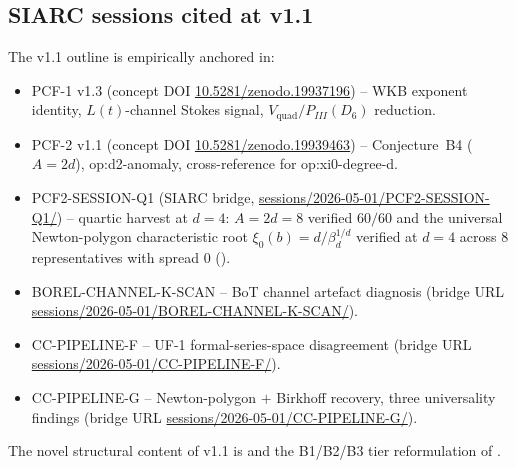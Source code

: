 \documentclass[11pt,reqno]{amsart}
\theoremstyle{plain}
\theoremstyle{definition}
\theoremstyle{remark}
\newcommand{\Lt}{L(t)}
\newcommand{\Vquad}{V_{\mathrm{quad}}}
\begin{document}
\subsection{SIARC sessions cited at v1.1}
The v1.1 outline is empirically anchored in:
\begin{itemize}
\item PCF-1 v1.3 \cite{siarc_pcf1_v13} (concept DOI
\href{https://doi.org/10.5281/zenodo.19937196}{10.5281/zenodo.19937196})
-- WKB exponent identity, $\Lt$-channel Stokes signal,
$\Vquad / P_{III}(D_6)$ reduction.
\item PCF-2 v1.1 \cite{siarc_pcf2_v11} (concept DOI
\href{https://doi.org/10.5281/zenodo.19939463}{10.5281/zenodo.19939463})
-- Conjecture~B4 ($A = 2d$), \textsf{op:d2-anomaly},
cross-reference for \textsf{op:xi0-degree-d}.
\item PCF2-SESSION-Q1 \cite{siarc_pcf2_session_q1}
(SIARC bridge,
\href{https://github.com/papanokechi/siarc-relay-bridge/tree/main/sessions/2026-05-01/PCF2-SESSION-Q1/}{sessions/2026-05-01/PCF2-SESSION-Q1/})
-- quartic harvest at $d=4$: $A = 2d = 8$ verified $60/60$
and the universal Newton-polygon characteristic root
$\xi_0(b) = d / \beta_d^{1/d}$ verified at $d=4$ across $8$
representatives with spread $0$
().
\item BOREL-CHANNEL-K-SCAN \cite{siarc_borel_kscan} -- BoT
channel artefact diagnosis (bridge URL
\href{https://github.com/papanokechi/siarc-relay-bridge/tree/main/sessions/2026-05-01/BOREL-CHANNEL-K-SCAN/}{sessions/2026-05-01/BOREL-CHANNEL-K-SCAN/}).
\item CC-PIPELINE-F \cite{siarc_cc_pipeline_f} -- UF-1
formal-series-space disagreement (bridge URL
\href{https://github.com/papanokechi/siarc-relay-bridge/tree/main/sessions/2026-05-01/CC-PIPELINE-F/}{sessions/2026-05-01/CC-PIPELINE-F/}).
\item CC-PIPELINE-G \cite{siarc_cc_pipeline_g} --
Newton-polygon $+$ Birkhoff recovery, three universality
findings (bridge URL
\href{https://github.com/papanokechi/siarc-relay-bridge/tree/main/sessions/2026-05-01/CC-PIPELINE-G/}{sessions/2026-05-01/CC-PIPELINE-G/}).
\end{itemize}

The novel structural content of v1.1 is
 and the
B1/B2/B3 tier reformulation of .
\end{document}
